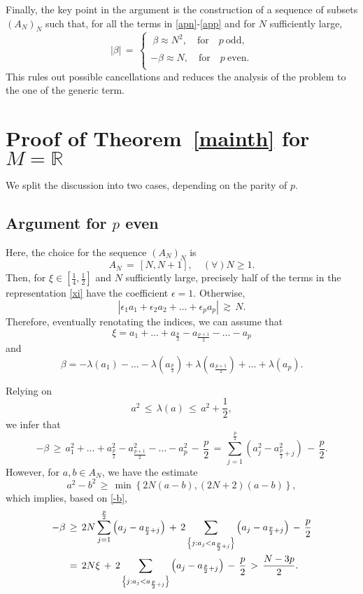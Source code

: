 \documentclass{amsart}
\newcommand{\R}{\mathbb{R}}
\begin{document}
Finally, the key point in the argument is the construction of a sequence of subsets $(A_N)_N$ such that, for all the terms in \eqref{apn}-\eqref{app} and for $N$ sufficiently large,
\begin{equation}
 |\beta|\,=\, \left\{
\begin{array}{l}
\ \beta \approx N^{2}, \quad \text{for} \quad p \ \text{odd},\\
\\
-\beta \approx N, \quad \text{for} \quad p \ \text{even}.\\
\end{array}\right.
\end{equation}
This rules out possible cancellations and reduces the analysis of the problem to the one of the generic term.

\section{Proof of Theorem~\texorpdfstring{\ref{mainth}}{} for \texorpdfstring{$M=\R$}{}}

We split the discussion into two cases, depending on the parity of $p$.

\subsection{Argument for \texorpdfstring{$p$}{} even}
Here, the choice for the sequence $(A_N)_N$ is 
\[
A_N\,=\,[N,N+1], \quad (\forall) N \geq 1.
\]
Then, for $\xi \in \left[\frac{1}{4},\frac{1}{2}\right]$ and $N$ sufficiently large, precisely half of the terms in the representation \eqref{xi} have the coefficient $\epsilon =1$. Otherwise,
\[
\left|\epsilon_1 a_1+\epsilon_2 a_2+ \ldots+\epsilon_p a_p\right|\,\gtrsim\,N.\]
Therefore, eventually renotating the indices, we can assume that
\[
\xi=a_1+ \ldots+ a_{\frac p2} - a_{\frac{p+1}{2}}-\ldots-a_p 
\]
and 
\[
\beta=-\lambda(a_1)- \ldots- \lambda(a_{\frac p2}) + \lambda(a_{\frac{p+1}{2}})+\ldots+ \lambda(a_p). 
\]

Relying on 
\[
a^2\,\leq\,\lambda (a)\,\leq\, a^2 +\frac 12,
\]
we infer that
\begin{equation}
-\beta\,\geq\, a^2_1+ \ldots+ a^2_{\frac p2} - a^2_{\frac{p+1}{2}}-\ldots-a^2_p\,-\,\frac p2\,=\,\sum_{j=1}^{\frac p2} \left(a^2_j-a^2_{\frac{p}{2}+j}\right)\,-\,\frac p2. 
\label{-b}
\end{equation}
However, for $a,b \in A_N$, we have the estimate
\[
a^2-b^2\,\geq\,\min\left\{ 2N(a-b),(2N+2)(a-b)\right\},
\]
which implies, based on \eqref{-b},
\begin{equation}
\aligned
-\beta\,&\geq\, 2N \sum_{j=1}^{\frac p2} \left(a_j-a_{\frac{p}{2}+j}\right)\,+\, 2 \sum_{\left\{j: a_j< a_{\frac{p}{2}+j}\right\}} \left(a_j-a_{\frac{p}{2}+j}\right)\,-\,\frac p2\\
&=\,2N\xi\,+\, 2 \sum_{\left\{j: a_j< a_{\frac{p}{2}+j}\right\}} \left(a_j-a_{\frac{p}{2}+j}\right)\,-\,\frac p2\,>\,\frac{N-3p}{2}.\endaligned
\label{-bN}
\end{equation}
\end{document}
